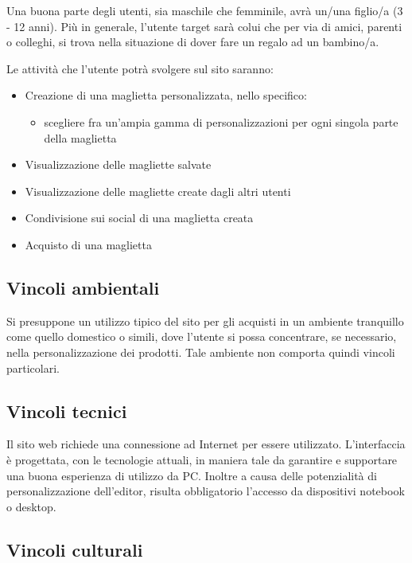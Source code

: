 \documentclass[12pt,italian,]{report}
\begin{document}
Una buona parte degli utenti, sia maschile che femminile, avrà un/una figlio/a (3 - 12 anni). 
Più in generale, l'utente target sarà colui che per via di amici, parenti o colleghi, si trova nella situazione di dover fare un regalo ad un bambino/a.

Le attività che l'utente potrà svolgere sul sito saranno:
\begin{itemize}
\item Creazione di una maglietta personalizzata, nello specifico: 
\begin{itemize}
\item scegliere fra un'ampia gamma di personalizzazioni per ogni singola parte della maglietta
\end{itemize}
\item Visualizzazione delle magliette salvate
\item Visualizzazione delle magliette create dagli altri utenti
\item Condivisione sui social di una maglietta creata
\item Acquisto di una maglietta
\end{itemize}

\subsection{Vincoli ambientali}\label{vincoli-ambientali}

Si presuppone un utilizzo tipico del sito per gli acquisti in un ambiente tranquillo come quello domestico o simili, dove l'utente si possa concentrare, se necessario, nella personalizzazione dei prodotti.
Tale ambiente non comporta quindi vincoli particolari.

\subsection{Vincoli tecnici}\label{vincoli-tecnici}

Il sito web richiede una connessione ad Internet per essere utilizzato.
L'interfaccia è progettata, con le tecnologie attuali, in maniera tale da garantire e supportare una buona esperienza di utilizzo da PC.
Inoltre a causa delle potenzialità di personalizzazione dell'editor, risulta obbligatorio l'accesso da dispositivi notebook o desktop.

\subsection{Vincoli culturali}\label{vincoli-culturali}
\end{document}
